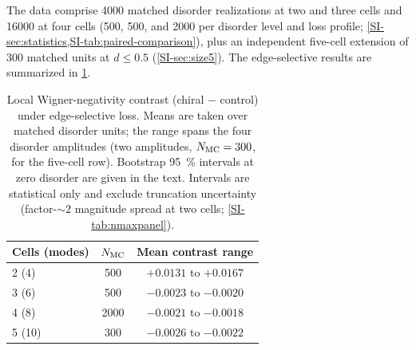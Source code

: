 \documentclass[aps,pra,preprint,superscriptaddress,amsmath,amssymb]{revtex4-2}
\begin{document}
The data comprise \num{4000} matched disorder realizations at two and three cells and \num{16000} at four cells (\num{500}, \num{500}, and \num{2000} per disorder level and loss profile; \cref{SI-sec:statistics,SI-tab:paired-comparison}), plus an independent five-cell extension of \num{300} matched units at $d\le\num{0.5}$ (\cref{SI-sec:size5}). The edge-selective results are summarized in \cref{tab:production}.

\begin{table}[htpb]
\caption{Local Wigner-negativity contrast (chiral $-$ control) under edge-selective loss. Means are taken over matched disorder units; the range spans the four disorder amplitudes (two amplitudes, $N_{\rm MC}=\num{300}$, for the five-cell row). Bootstrap \qty{95}{\percent} intervals at zero disorder are given in the text. Intervals are statistical only and exclude truncation uncertainty (factor-$\sim\num{2}$ magnitude spread at two cells; \cref{SI-tab:nmaxpanel}).}
\label{tab:production}
\begin{ruledtabular}
\begin{tabular}{lcc}
Cells (modes) & $N_{\rm MC}$ & Mean contrast range \\
\hline
\num{2} (\num{4}) & \num{500} & $+\num{0.0131}$ to $+\num{0.0167}$ \\
\num{3} (\num{6}) & \num{500} & $-\num{0.0023}$ to $-\num{0.0020}$ \\
\num{4} (\num{8}) & \num{2000} & $-\num{0.0021}$ to $-\num{0.0018}$ \\
\num{5} (\num{10}) & \num{300} & $-\num{0.0026}$ to $-\num{0.0022}$ \\
\end{tabular}
\end{ruledtabular}
\end{table}
\end{document}
